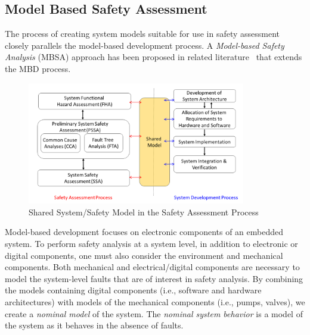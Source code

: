 \subsection{Model Based Safety Assessment}
\label{subsec:mbsa}
The process of creating system models suitable for use in safety assessment closely parallels the model-based development process. A \emph{Model-based Safety Analysis} (MBSA) approach has been proposed in related literature~\cite{Joshi05:Dasc, joshi2008behavioral, criticalembeddedsystems} that extends the MBD process. 

\begin{figure}[h]
	\centering
	\includegraphics[trim=0 5 0 5,clip,width=0.85\textwidth]{images/process3.png}
	\caption{Shared System/Safety Model in the Safety Assessment Process}
	\label{fig:proposed_safety_process}
\end{figure}

Model-based development focuses on electronic components of an embedded system. To perform safety analysis at a system level, in addition to electronic or digital components, one must also consider the environment and mechanical components. Both mechanical and electrical/digital components are necessary to model the system-level faults that are of interest in safety analysis. By combining the models containing digital components (i.e., software and hardware architectures) with models of the mechanical components (i.e., pumps, valves), we create a \emph{nominal model} of the system. The \emph{nominal system behavior} is a model of the system as it behaves in the absence of faults. 


